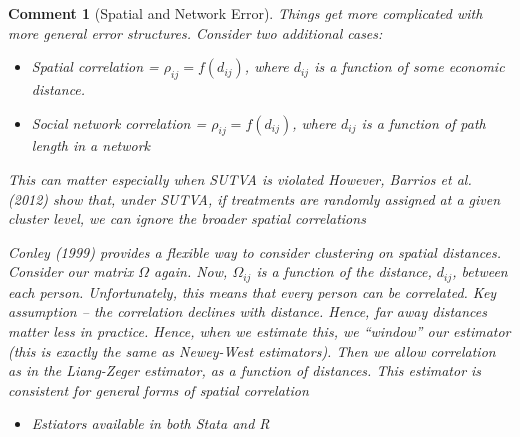 \documentclass{tufte-handout}
\theoremstyle{break}
\newtheorem{cmt}{Comment}
\begin{document}
    \begin{boxF}
\begin{cmt}[Spatial and Network Error]
  Things get more complicated with more general error structures. Consider two additional cases:
    \begin{itemize}
    \item Spatial correlation = $\rho_{ij} = f(d_{ij})$, where $d_{ij}$ is a function of some economic distance.
    \item Social network correlation = $\rho_{ij} = f(d_{ij})$, where $d_{ij}$ is a function of path length in a network
    \end{itemize}
  This can matter especially when SUTVA is violated
 However, Barrios et al. (2012) show that, under SUTVA, if
    treatments are randomly assigned at a given cluster level, we can
    ignore the broader spatial correlations


Conley (1999) provides a flexible way to consider clustering on spatial distances.
Consider our matrix $\Omega$ again. Now, $\Omega_{ij}$ is a
    function of the distance, $d_{ij}$, between each
    person. Unfortunately, this means that every person can be
    correlated.
Key assumption -- the correlation declines with
    distance. Hence, far away distances matter less in
    practice. Hence, when we estimate this, we ``window'' our
    estimator (this is exactly the same as Newey-West
    estimators). Then we allow correlation as in the Liang-Zeger
    estimator, as a function of distances.
This estimator is consistent for general forms of spatial
    correlation
    \begin{itemize}
    \item Estiators available in both Stata and R
    \end{itemize}
  \end{cmt}
\end{boxF}
\end{document}
